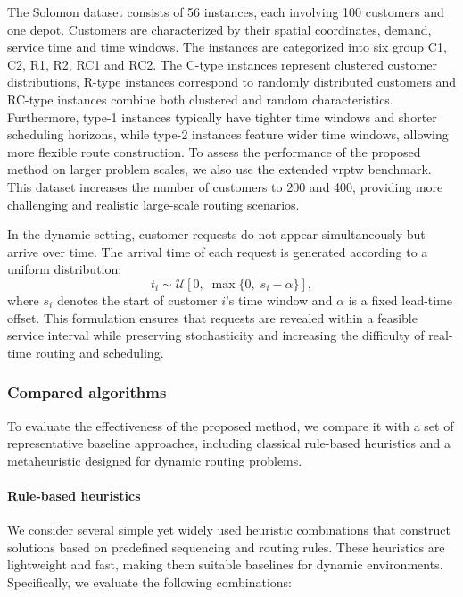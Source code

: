\documentclass[pdflatex]{sn-jnl}
\begin{document}
The Solomon dataset consists of 56 instances, each involving 100 customers and one depot. Customers are characterized by their spatial coordinates, demand, service time and time windows. The instances are categorized into six group C1, C2, R1, R2, RC1 and RC2. The C-type instances represent clustered customer distributions, R-type instances correspond to randomly distributed customers and RC-type instances combine both clustered and random characteristics. Furthermore, type-1 instances typically have tighter time windows and shorter scheduling horizons, while type-2 instances feature wider time windows, allowing more flexible route construction. To assess the performance of the proposed method on larger problem scales, we also use the extended \gls{vrptw} benchmark. This dataset increases the number of customers to 200 and 400, providing more challenging and realistic large-scale routing scenarios.

In the dynamic setting, customer requests do not appear simultaneously but arrive over time. The arrival time of each request is generated according to a uniform distribution:
\[
t_i \sim \mathcal{U}\left[0,\; \max\{0,\; s_i - \alpha\}\right],
\]
where $s_i$ denotes the start of customer $i$'s time window and $\alpha$ is a fixed lead-time offset. This formulation ensures that requests are revealed within a feasible service interval while preserving stochasticity and increasing the difficulty of real-time routing and scheduling.
\subsubsection{Compared algorithms}

To evaluate the effectiveness of the proposed method, we compare it with a set of representative baseline approaches, including classical rule-based heuristics and a metaheuristic designed for dynamic routing problems.

\paragraph{Rule-based heuristics}
We consider several simple yet widely used heuristic combinations that construct solutions based on predefined sequencing and routing rules. These heuristics are lightweight and fast, making them suitable baselines for dynamic environments. Specifically, we evaluate the following combinations:
\end{document}
